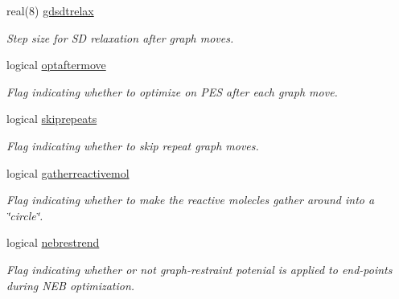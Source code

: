 \begin{DoxyCompactItemize}
real(8) \mbox{\hyperlink{namespaceglobaldata_a3cb6c7ae6391331e0c9d9cf264c1e7a2}{gdsdtrelax}}
\begin{DoxyCompactList}\small\item\em Step size for SD relaxation after graph moves. \end{DoxyCompactList}\item 
\mbox{\label{namespaceglobaldata_ad786f46c3bbc2800abc29bd3d44dd1e5}} 
logical \mbox{\hyperlink{namespaceglobaldata_ad786f46c3bbc2800abc29bd3d44dd1e5}{optaftermove}}
\begin{DoxyCompactList}\small\item\em Flag indicating whether to optimize on P\+ES after each graph move. \end{DoxyCompactList}\item 
\mbox{\label{namespaceglobaldata_a0f53d3df629445794158e7bdc6eb68c1}} 
logical \mbox{\hyperlink{namespaceglobaldata_a0f53d3df629445794158e7bdc6eb68c1}{skiprepeats}}
\begin{DoxyCompactList}\small\item\em Flag indicating whether to skip repeat graph moves. \end{DoxyCompactList}\item 
\mbox{\label{namespaceglobaldata_aa8618a925ab5655a3776dc7d8c42a0b3}} 
logical \mbox{\hyperlink{namespaceglobaldata_aa8618a925ab5655a3776dc7d8c42a0b3}{gatherreactivemol}}
\begin{DoxyCompactList}\small\item\em Flag indicating whether to make the reactive molecles gather around into a \char`\"{}circle\char`\"{}. \end{DoxyCompactList}\item 
\mbox{\label{namespaceglobaldata_a154295eac2e59bdc87238ec06685edff}} 
logical \mbox{\hyperlink{namespaceglobaldata_a154295eac2e59bdc87238ec06685edff}{nebrestrend}}
\begin{DoxyCompactList}\small\item\em Flag indicating whether or not graph-\/restraint potenial is applied to end-\/points during N\+EB optimization. \end{DoxyCompactList}\item 
\mbox{\label{namespaceglobaldata_aece6803e92a5587b17d4c456147be1be}} 

\end{DoxyCompactItemize}
